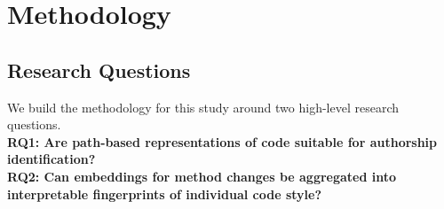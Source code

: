 \section{Methodology}
\subsection{Research Questions}
We build the methodology for this study around two high-level research questions.\\
\textbf{RQ1: Are path-based representations of code suitable for authorship identification?}\\
\textbf{RQ2: Can embeddings for method changes be aggregated into interpretable fingerprints of individual code style?}\\